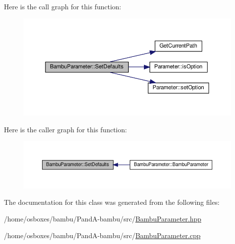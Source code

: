 Here is the call graph for this function\+:
\nopagebreak
\begin{figure}[H]
\begin{center}
\leavevmode
\includegraphics[width=350pt]{d4/d67/classBambuParameter_a248447b97f9e6302fc1a356d1a34333e_cgraph}
\end{center}
\end{figure}
Here is the caller graph for this function\+:
\nopagebreak
\begin{figure}[H]
\begin{center}
\leavevmode
\includegraphics[width=350pt]{d4/d67/classBambuParameter_a248447b97f9e6302fc1a356d1a34333e_icgraph}
\end{center}
\end{figure}


The documentation for this class was generated from the following files\+:\begin{DoxyCompactItemize}
\item 
/home/osboxes/bambu/\+Pand\+A-\/bambu/src/\hyperlink{BambuParameter_8hpp}{Bambu\+Parameter.\+hpp}\item 
/home/osboxes/bambu/\+Pand\+A-\/bambu/src/\hyperlink{BambuParameter_8cpp}{Bambu\+Parameter.\+cpp}\end{DoxyCompactItemize}
